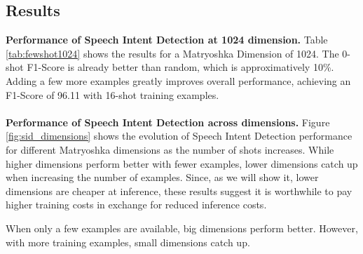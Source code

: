 \documentclass[11pt]{article}
\newcommand{\myparagraph}[1]{\noindent\textbf{#1}}
\begin{document}
\subsection{Results}
\myparagraph{Performance of Speech Intent Detection at 1024 dimension.} Table \ref{tab:fewshot1024} shows the results for a Matryoshka Dimension of 1024. The 0-shot F1-Score is already better than random, which is approximatively 10\%. Adding a few more examples greatly improves overall performance, achieving an F1-Score of 96.11 with 16-shot training examples.
\\
\\
\myparagraph{Performance of Speech Intent Detection across dimensions.} Figure \ref{fig:sid_dimensions} shows the evolution of Speech Intent Detection performance for different Matryoshka dimensions as the number of shots increases. While higher dimensions perform better with fewer examples, lower dimensions catch up when increasing the number of examples. Since, as we will show it, lower dimensions are cheaper at inference, these results suggest it is worthwhile to pay higher training costs in exchange for reduced inference costs.
\begin{tcolorbox}[compactbox,colback=violet!15!white,colframe=violet!100!white,title={\color{black} \textbf{Finding 3}: Big dimensions adapt quickly to new tasks, smaller ones need more data.}]
When only a few examples are available, big dimensions perform better. However, with more training examples, small dimensions catch up.
\end{tcolorbox}
\end{document}
